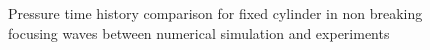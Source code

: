 \documentclass[preprint,12pt]{article}
\begin{document}
{\begin{figure}
	
\caption{Pressure time history comparison for fixed cylinder in non breaking focusing waves between numerical simulation and experiments} \label{fig:NBR_fixed_PP}

\end{figure}


}
\end{document}
